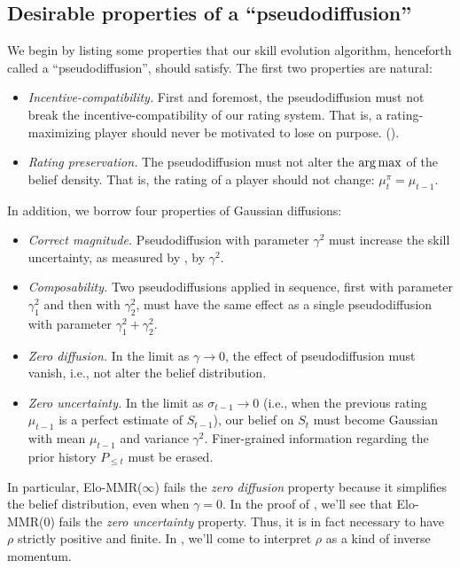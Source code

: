 \subsection{Desirable properties of a ``pseudodiffusion''}
\label{sec:desirable-props}
We begin by listing some properties that our skill evolution algorithm, henceforth called a ``pseudodiffusion'', should satisfy. The first two properties are natural:
\begin{itemize}[leftmargin=*]
\item \emph{Incentive-compatibility.} First and foremost, the pseudodiffusion must not break the incentive-compatibility of our rating system. That is, a rating-maximizing player should never be motivated to lose on purpose. ().
\item \emph{Rating preservation.} The pseudodiffusion must not alter the $\operatorname*{arg\,max}$ of the belief density. That is, the rating of a player should not change: $\mu^\pi_t = \mu_{t-1}$.
\end{itemize}
In addition, we borrow four properties of Gaussian diffusions:
\begin{itemize}[leftmargin=*]
\item \emph{Correct magnitude.} Pseudodiffusion with parameter $\gamma^2$ must increase the skill uncertainty, as measured by , by $\gamma^2$.
\item \emph{Composability.} Two pseudodiffusions applied in sequence, first with parameter $\gamma_1^2$ and then with $\gamma_2^2$, must have the same effect as a single pseudodiffusion with parameter $\gamma_1^2 + \gamma_2^2$.
\item \emph{Zero diffusion.} In the limit as $\gamma \rightarrow 0$, the effect of pseudodiffusion must vanish, i.e., not alter the belief distribution.
\item \emph{Zero uncertainty.} In the limit as $\sigma_{t-1}\rightarrow 0$ (i.e., when the previous rating $\mu_{t-1}$ is a perfect estimate of $S_{t-1}$), our belief on $S_t$ must become Gaussian with mean $\mu_{t-1}$ and variance $\gamma^2$. Finer-grained information regarding the prior history $P_{\le t}$ must be erased.
\end{itemize}
In particular, Elo-MMR($\infty$) fails the \emph{zero diffusion} property because it simplifies the belief distribution, even when $\gamma=0$. In the proof of , we'll see that Elo-MMR($0$) fails the \emph{zero uncertainty} property. Thus, it is in fact necessary to have $\rho$ strictly positive and finite. In , we'll come to interpret $\rho$ as a kind of inverse momentum.

